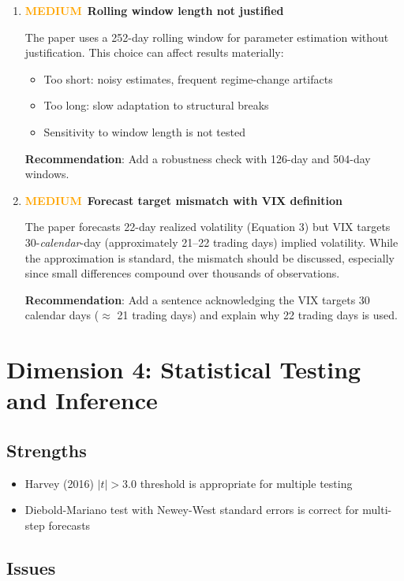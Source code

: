 \documentclass[12pt,a4paper]{article}
\newcommand{\MEDIUM}{\textcolor{orange}{\textbf{MEDIUM}}}
\begin{document}
\begin{enumerate}[label=D3.\arabic*]
\item \MEDIUM\ \textbf{Rolling window length not justified}

The paper uses a 252-day rolling window for parameter estimation without justification. This choice can affect results materially:
\begin{itemize}
    \item Too short: noisy estimates, frequent regime-change artifacts
    \item Too long: slow adaptation to structural breaks
    \item Sensitivity to window length is not tested
\end{itemize}
\textbf{Recommendation}: Add a robustness check with 126-day and 504-day windows.

\item \MEDIUM\ \textbf{Forecast target mismatch with VIX definition}

The paper forecasts 22-day realized volatility (Equation 3) but VIX targets 30-\emph{calendar}-day (approximately 21--22 trading days) implied volatility. While the approximation is standard, the mismatch should be discussed, especially since small differences compound over thousands of observations.

\textbf{Recommendation}: Add a sentence acknowledging the VIX targets 30 calendar days ($\approx$ 21 trading days) and explain why 22 trading days is used.

\end{enumerate}


\section{Dimension 4: Statistical Testing and Inference}
\label{sec:d4}

\subsection*{Strengths}
\begin{itemize}
    \item Harvey (2016) $|t|>3.0$ threshold is appropriate for multiple testing
    \item Diebold-Mariano test with Newey-West standard errors is correct for multi-step forecasts
\end{itemize}

\subsection*{Issues}
\end{document}
